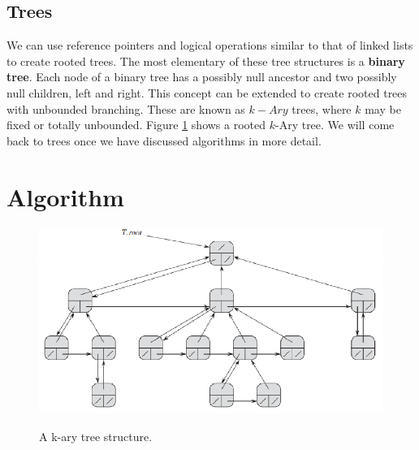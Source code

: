\documentclass[10pt,a4paper]{article}
\begin{document}
\subsection{Trees}
We can use reference pointers and logical operations similar to that of linked lists to create rooted trees. The most elementary of these tree structures is a {\bf binary tree}. Each node of a binary tree has a possibly null ancestor and two possibly null children, left and right. This concept can be extended to create rooted trees with unbounded branching. These are known as $k-Ary$ trees, where $k$ may be fixed or totally unbounded. Figure \ref{kary} shows a rooted $k$-Ary tree. We will come back to trees once we have discussed algorithms in more detail.
\section{Algorithm}
 \begin{figure}
\caption{A k-ary tree structure.\cite{OSCONCEPTS}}
\begin{center}
\includegraphics[scale=0.5]{../images/kary.png}
\label{kary}
\end{center}
\end{figure}
\end{document}
